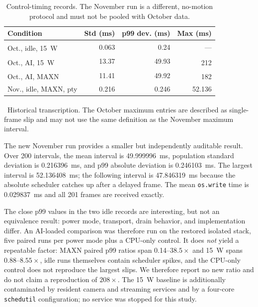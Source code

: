 \documentclass[conference]{IEEEtran}
\newcommand{\code}[1]{\texttt{#1}}
\newcommand{\histnote}{\textsuperscript{\dag}}
\begin{document}
\begin{table}[t]
\centering
\caption{Control-timing records. The November run is a different, no-motion protocol and must not be pooled with October data.}
\label{tab:timing}
\small
\begin{tabularx}{\columnwidth}{@{}p{27mm}rrr@{}}
\toprule
Condition & Std (ms) & p99 dev. (ms) & Max (ms)\\
\midrule
Oct., idle, 15~W\histnote & 0.063 & 0.24 & ---\\
Oct., AI, 15~W\histnote & 13.37 & 49.93 & 212\histnote\\
Oct., AI, MAXN\histnote & 11.41 & 49.92 & 182\histnote\\
Nov., idle, MAXN, pty & 0.216 & 0.246 & 52.136\\
\bottomrule
\end{tabularx}
\vspace{2pt}
\begin{flushleft}
\footnotesize \histnote~Historical transcription. The October maximum entries are described as single-frame slip and may not use the same definition as the November maximum interval.
\end{flushleft}
\end{table}

The new November run provides a smaller but independently auditable result. Over 200 intervals, the mean interval is 49.999996~ms, population standard deviation is 0.216396~ms, and p99 absolute deviation is 0.246103~ms. The largest interval is 52.136408~ms; the following interval is 47.846319~ms because the absolute scheduler catches up after a delayed frame. The mean \code{os.write} time is 0.029837~ms and all 201 frames are received exactly.

The close p99 values in the two idle records are interesting, but not an equivalence result: power mode, transport, drain behavior, and implementation differ. An AI-loaded comparison was therefore run on the restored isolated stack, five paired runs per power mode plus a CPU-only control. It does \emph{not} yield a repeatable factor: MAXN paired p99 ratios span 0.14--$38.5\times$ and 15~W spans 0.88--$8.55\times$, idle runs themselves contain scheduler spikes, and the CPU-only control does not reproduce the largest slips. We therefore report no new ratio and do not claim a reproduction of $208\times$. The 15~W baseline is additionally contaminated by resident camera and streaming services and by a four-core \code{schedutil} configuration; no service was stopped for this study.
\end{document}
